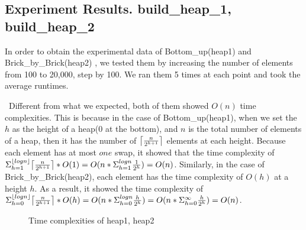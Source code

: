 \documentclass[12pt]{article}
\DeclarePairedDelimiter\ceil{\lceil}{\rceil}
\DeclarePairedDelimiter\floor{\lfloor}{\rfloor}
\begin{document}
\newpage
\subsection{Experiment Results. build\_heap\_1, build\_heap\_2}
In order to obtain the experimental data of Bottom\_up(heap1) and Brick\_by\_Brick(heap2)
, we tested them by increasing the number of elements 
from 100 to 20,000, step by 100. We ran them 5 times at each point and 
took the average runtimes. 

~\newline\noindent Different from what we expected, both of them showed
 $O(n)$ time complexities. This is because in the case of Bottom\_up(heap1),
 when we set the $h$ as the height of a heap(0 at the bottom), 
 and $n$ is the total number of elements of a heap, then it has the number of
 $ \ceil*{\frac{n}{2^{h+1}}} $ elements at each height. Because each element
 has at most $one$ swap, it showed that the time complexity of 
 $ \Sigma_{h=1}^{ \floor{log{n}}} \ceil*{\frac{n}{2^{h+1}}} * O(1)
  = O(n * \Sigma_{h=1}^{log{n}} \frac{1}{2^{h}}) = O(n)$.  
Similarly, in the case of Brick\_by\_Brick(heap2), each element 
has the time complexity of $O(h)$ at a height $h$. 
As a result, it showed the time complexity of $ \Sigma_{h=0}^{ \floor{log{n}}} 
\ceil*{\frac{n}{2^{h+1}}} * O(h) = O(n * \Sigma_{h=0}^{log{n}} \frac{h}{2^{h}}) 
= O(n * \Sigma_{h=0}^{\infty} \frac{h}{2^{h}}) = O(n)$. \cite{wikipedia}

\begin{figure}[hbt!]
  \centering
  \hfill
  \caption{Time complexities of heap1, heap2}
\end{figure}
\end{document}
